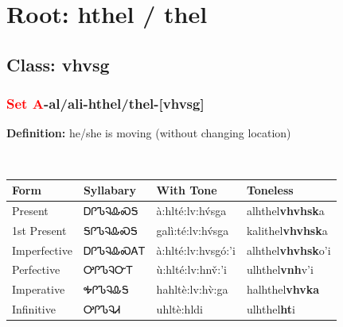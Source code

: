 \needspace{4in}
\section*{Root: hthel / thel}
\nopagebreak
{}
\needspace{3in}
\subsection*{Class: vhvsg}
\nopagebreak
\needspace{2in}
\subsubsection*{\textcolor{Red}{Set A}{-}al/ali{-}\textbf{hthel/thel}{-}[vhvsg]}
\nopagebreak
\textbf{Definition: } he/she is moving (without changing location)
\\[0.5em]
\begin{tabularx}{\textwidth}{l X X X}%
\toprule%
\textbf{Form}&\textbf{Syllabary}&\textbf{With Tone}&\textbf{Toneless}\\%
\midrule%
Present&ᎠᎵᏖᎸᎲᏍᎦ&à:hlté:lv:hv́sga&alhthel\textbf{vhvhsk}a\\%
1st Present&ᎦᎵᏖᎸᎲᏍᎦ&galì:té:lv:hv́sga&kalithel\textbf{vhvhsk}a\\%
Imperfective&ᎠᎵᏖᎸᎲᏍᎪᎢ&à:hlté:lv:hvsgó:’i&alhthel\textbf{vhvhsk}o'i\\%
Perfective&ᎤᎵᏖᎸᏅᎢ&ù:hlté:lv:hnv̌:’i&ulhthel\textbf{vnh}v'i\\%
Imperative&ᎭᎵᏖᎸᎲᎦ&hahltè:lv:hv̀:ga&halhthel\textbf{vhvka}\\%
Infinitive&ᎤᎵᏖᎸᏗ&uhltè:hldi&ulhthel\textbf{ht}i\\%
\bottomrule%
\end{tabularx}
\\[1em]